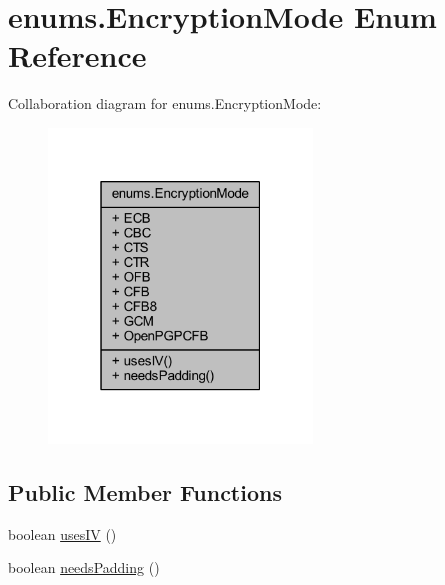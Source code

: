 \hypertarget{enumenums_1_1_encryption_mode}{}\section{enums.\+Encryption\+Mode Enum Reference}
\label{enumenums_1_1_encryption_mode}


Collaboration diagram for enums.\+Encryption\+Mode\+:\nopagebreak
\begin{figure}[H]
\begin{center}
\leavevmode
\includegraphics[width=199pt]{enumenums_1_1_encryption_mode__coll__graph}
\end{center}
\end{figure}
\subsection*{Public Member Functions}
\begin{DoxyCompactItemize}
\item 
boolean \mbox{\hyperlink{enumenums_1_1_encryption_mode_abd079d0267c38ed9c88cb1b49ac2d4ee}{uses\+IV}} ()
\item 
boolean \mbox{\hyperlink{enumenums_1_1_encryption_mode_abc3ed93ffd8203abd9318e8c6ea057ba}{needs\+Padding}} ()
\end{DoxyCompactItemize}
